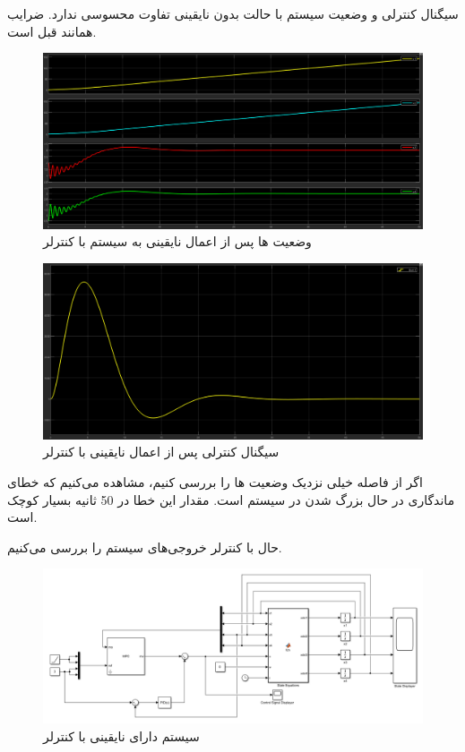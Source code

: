 \documentclass[14pt, a4paper]{extarticle}
\begin{document}
\newpage

سیگنال کنترلی و وضعیت سیستم با حالت بدون نایقینی تفاوت محسوسی ندارد.‌ ضرایب 
همانند قبل است.
\begin{figure}[h!]
	\centering
	\includegraphics[scale = 0.4]{Q2_4_1_states.png}
	\caption{وضعیت 
		ها پس از اعمال نایقینی به سیستم با کنترلر 
		}
\end{figure}

\begin{figure}[h!]
	\centering
	\includegraphics[scale = 0.4]{Q2_4_1_control.png}
	\caption{سیگنال کنترلی پس از اعمال نایقینی با کنترلر 
		}
\end{figure}

اگر از فاصله خیلی نزدیک وضعیت 
ها را بررسی کنیم، مشاهده می‌کنیم که خطای ماندگاری در حال بزرگ شدن در سیستم است. مقدار این خطا در 50 ثانیه بسیار کوچک است.

\newpage
حال با کنترلر 
خروجی‌های سیستم را بررسی می‌کنیم.
\begin{figure}[h!]
	\centering
	\includegraphics[scale = 0.5]{Q2_4_sim.png}
	\caption{سیستم دارای نایقینی با کنترلر 
		}
\end{figure}
\end{document}
